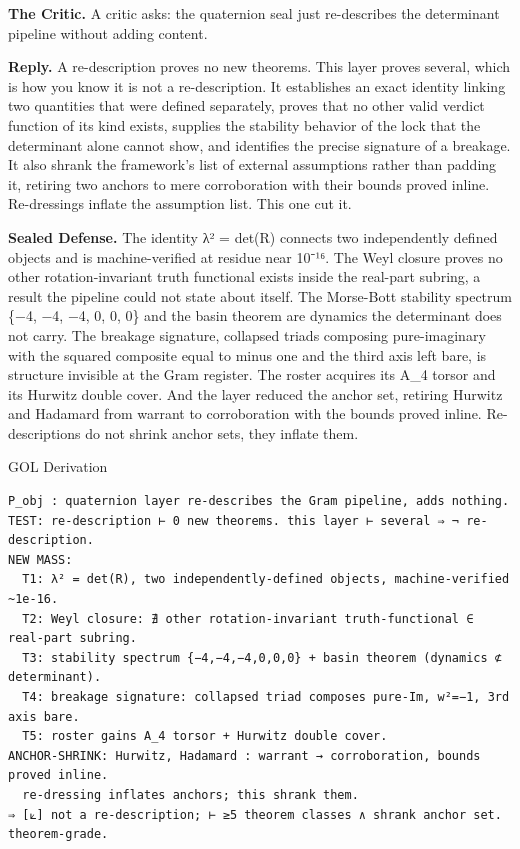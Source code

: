 \documentclass[10pt,twocolumn]{article}
\begin{document}
\textbf{The Critic.} A critic asks: the quaternion seal just
re-describes the determinant pipeline without adding content.

\textbf{Reply.} A re-description proves no new theorems. This layer
proves several, which is how you know it is not a re-description. It
establishes an exact identity linking two quantities that were defined
separately, proves that no other valid verdict function of its kind
exists, supplies the stability behavior of the lock that the determinant
alone cannot show, and identifies the precise signature of a breakage.
It also shrank the framework's list of external assumptions rather than
padding it, retiring two anchors to mere corroboration with their bounds
proved inline. Re-dressings inflate the assumption list. This one cut
it.

\textbf{Sealed Defense.} The identity λ² = det(R) connects two
independently defined objects and is machine-verified at residue near
10⁻¹⁶. The Weyl closure proves no other rotation-invariant truth
functional exists inside the real-part subring, a result the pipeline
could not state about itself. The Morse-Bott stability spectrum \{−4,
−4, −4, 0, 0, 0\} and the basin theorem are dynamics the determinant
does not carry. The breakage signature, collapsed triads composing
pure-imaginary with the squared composite equal to minus one and the
third axis left bare, is structure invisible at the Gram register. The
roster acquires its A\_4 torsor and its Hurwitz double cover. And the
layer reduced the anchor set, retiring Hurwitz and Hadamard from warrant
to corroboration with the bounds proved inline. Re-descriptions do not
shrink anchor sets, they inflate them.

\begin{golbox}{GOL Derivation}
\begin{lstlisting}[style=golv]
P_obj : quaternion layer re-describes the Gram pipeline, adds nothing.
TEST: re-description ⊢ 0 new theorems. this layer ⊢ several ⇒ ¬ re-description.
NEW MASS:
  T1: λ² = det(R), two independently-defined objects, machine-verified ~1e-16.
  T2: Weyl closure: ∄ other rotation-invariant truth-functional ∈ real-part subring.
  T3: stability spectrum {−4,−4,−4,0,0,0} + basin theorem (dynamics ⊄ determinant).
  T4: breakage signature: collapsed triad composes pure-Im, w²=−1, 3rd axis bare.
  T5: roster gains A_4 torsor + Hurwitz double cover.
ANCHOR-SHRINK: Hurwitz, Hadamard : warrant → corroboration, bounds proved inline.
  re-dressing inflates anchors; this shrank them.
⇒ [⟀] not a re-description; ⊢ ≥5 theorem classes ∧ shrank anchor set. theorem-grade.
\end{lstlisting}
\end{golbox}
\end{document}
